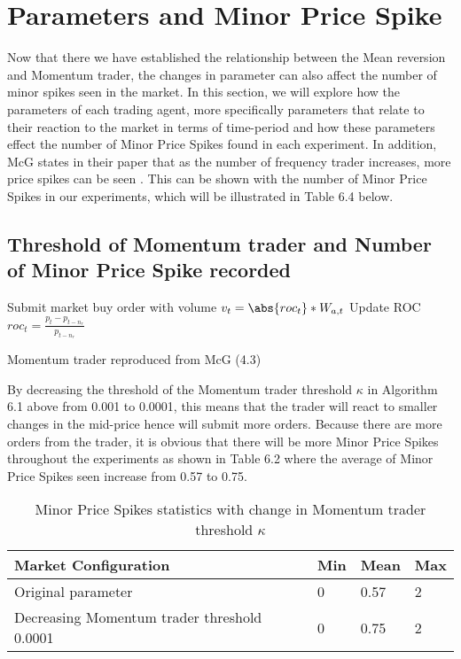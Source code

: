 \section{Parameters and Minor Price Spike}
Now that there we have established the relationship between the Mean reversion and Momentum trader, the changes in parameter can also affect the number of minor spikes seen in the market. In this section, we will explore how the parameters of each trading agent, more specifically parameters that relate to their reaction to the market in terms of time-period and how these parameters effect the number of Minor Price Spikes found in each experiment. In addition, McG states in their paper that as the number of frequency trader increases, more price spikes can be seen \cite{McGroarty}. This can be shown with the number of Minor Price Spikes in our experiments, which will be illustrated in Table 6.4 below. 

\subsection{Threshold of Momentum trader and Number of Minor Price Spike recorded}

\begin{algorithm}[H]
\DontPrintSemicolon 
{} {
     {
    Submit market buy order with volume $v_t = \abs{roc_t} * W_{a,t}$\;
    }
    \EndIf
  }
\EndIf
Update ROC $roc_t = \frac{p_t - p_{t-n_r}}{p_{t-n_r}}$\;  
\caption{{\sc Momentum trader reproduced from McG (4.3) \cite{McGroarty} } }
\label{algo:max}
\end{algorithm}

By decreasing the threshold of the Momentum trader threshold $\kappa $ in Algorithm 6.1 above from 0.001 to 0.0001, this means that the trader will react to smaller changes in the mid-price hence will submit more orders. Because there are more orders from the trader, it is obvious that there will be more Minor Price Spikes throughout the experiments as shown in Table 6.2 where the average of Minor Price Spikes seen increase from 0.57 to 0.75. 

\begin{table}[h]
\centering  
\begin{tabular}{ |m||p{2cm}|p{2cm}|p{2cm}|} 
\hline
\textbf{Market Configuration}& \textbf{ Min } & \textbf{ Mean } & \textbf{ Max}\\
\hline
\hline
Original parameter & 0 & 0.57 & 2 \\ 
\hline
Decreasing Momentum trader threshold 0.0001 & 0 & 0.75 & 2 \\ 
\hline 
\hline
\end{tabular}
\label{Tab:6.2}
\caption{Minor Price Spikes statistics with change in Momentum trader threshold $\kappa$}  
\end{table}
\FloatBarrier

